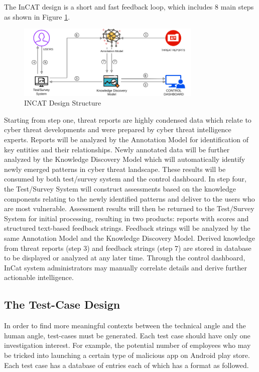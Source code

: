 \documentclass[conference]{IEEEtran}
\begin{document}
The InCAT design is a short and fast feedback loop, which includes 8 main steps as shown in Figure \ref{Figure:IncatDesign}. 

\begin{figure}[ht]
  \centering
  \includegraphics[width=8.8cm]{images/INCAT-Designs}
  \caption{INCAT Design Structure}
  \label{Figure:IncatDesign}
\end{figure}

Starting from step one, threat reports are highly condensed data which relate to cyber threat developments and were prepared by cyber threat intelligence experts. Reports will be analyzed by the Annotation Model for identification of key entities and their relationships. Newly annotated data will be further analyzed by the Knowledge Discovery Model which will automatically identify newly emerged patterns in cyber threat landscape. These results will be consumed by both test/survey system and the control dashboard. In step four, the Test/Survey System will construct assessments based on the knowledge components relating to the newly identified patterns and deliver to the users who are most vulnerable. Assessment results will then be returned to the Test/Survey System for initial processing, resulting in two products: reports with scores and structured text-based feedback strings. Feedback strings will be analyzed by the same Annotation Model and the Knowledge Discovery Model. Derived knowledge from threat reports (step 3) and feedback strings (step 7) are stored in database to be displayed or analyzed at any later time. Through the control dashboard, InCat system administrators may manually correlate details and derive further actionable intelligence.

\subsection{The Test-Case Design}
In order to find more meaningful contexts between the technical angle and the human angle, test-cases must be generated. Each test case should have only one investigation interest. For example, the potential number of employees who may be tricked into launching a certain type of malicious app on Android play store. Each test case has a database of entries each of which has a format as followed.
\end{document}
